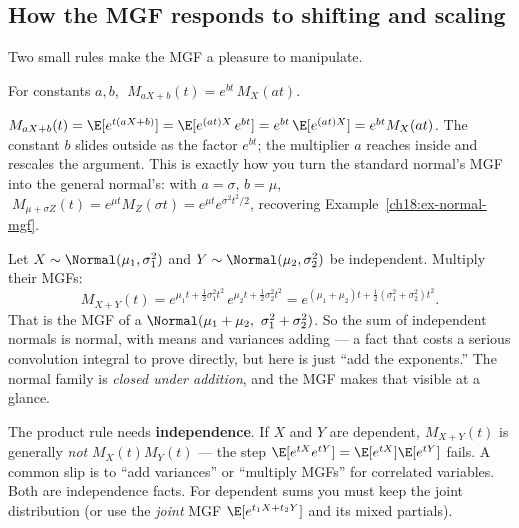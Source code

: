 \subsection{How the MGF responds to shifting and scaling}

Two small rules make the MGF a pleasure to manipulate.

\begin{proposition}
\label{ch18:prop-affine}
For constants $a,b$, $\;M_{aX+b}(t) = e^{bt}\,M_X(at).$
\end{proposition}

\begin{whybox}
$M_{aX+b}(t)=\E[e^{t(aX+b)}]=\E[e^{(at)X}\,e^{bt}] = e^{bt}\,\E[e^{(at)X}] =
e^{bt}M_X(at)$. The constant $b$ slides outside as the factor $e^{bt}$; the
multiplier $a$ reaches inside and rescales the argument. This is exactly how you
turn the standard normal's MGF into the general normal's: with $a=\sigma$,
$b=\mu$, $\;M_{\mu+\sigma Z}(t)=e^{\mu t}M_Z(\sigma t)=e^{\mu t}e^{\sigma^2
t^2/2}$, recovering Example~\ref{ch18:ex-normal-mgf}.
\end{whybox}

\begin{example}
\label{ch18:ex-normal-sum}
Let $X\sim\Normal(\mu_1,\sigma_1^2)$ and $Y\sim\Normal(\mu_2,\sigma_2^2)$ be
independent. Multiply their MGFs:
\[
  M_{X+Y}(t)=e^{\mu_1 t+\frac12\sigma_1^2 t^2}\,
             e^{\mu_2 t+\frac12\sigma_2^2 t^2}
            =e^{(\mu_1+\mu_2)t+\frac12(\sigma_1^2+\sigma_2^2)t^2}.
\]
That is the MGF of a $\Normal(\mu_1+\mu_2,\ \sigma_1^2+\sigma_2^2)$. So the sum
of independent normals is normal, with means and variances adding --- a fact
that costs a serious convolution integral to prove directly, but here is just
``add the exponents.'' The normal family is \emph{closed under addition}, and
the MGF makes that visible at a glance.
\end{example}

\begin{trapbox}
The product rule needs \textbf{independence}. If $X$ and $Y$ are dependent,
$M_{X+Y}(t)$ is generally \emph{not} $M_X(t)M_Y(t)$ --- the step
$\E[e^{tX}e^{tY}]=\E[e^{tX}]\E[e^{tY}]$ fails. A common slip is to ``add
variances'' or ``multiply MGFs'' for correlated variables. Both are independence
facts. For dependent sums you must keep the joint distribution (or use the
\emph{joint} MGF $\E[e^{t_1 X + t_2 Y}]$ and its mixed partials).
\end{trapbox}

